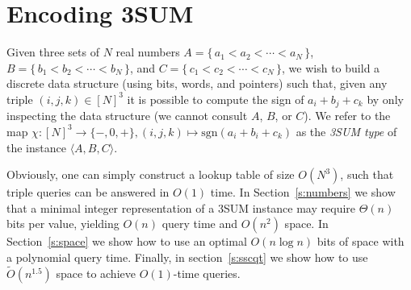 \chapter{Encoding 3SUM}
\label{paper:3sum-encoding}

Given three sets of \(N\) real numbers
\(A = \{\, a_1 < a_2 < \cdots < a_N\,\} \),
\(B = \{\, b_1 < b_2 < \cdots < b_N\,\} \),
and \(C = \{\, c_1 < c_2 < \cdots < c_N\,\}\),
we wish to build a discrete data structure (using bits, words, and pointers) such that,
given any triple \((i,j,k) \in {[N]}^3\) it is possible to compute the sign of
\(a_i + b_j + c_k\) by only inspecting the data structure (we cannot consult
\(A\), \(B\), or \(C\)).
We refer to the map $\chi : {[N]}^3\to \{-,0,+\}, (i,j,k)\mapsto\mathrm{sgn}
(a_i+b_i+c_k)$ as the {\em 3SUM type} of the instance $\langle A,B,C \rangle$.

Obviously, one can simply construct a lookup table of size \(O(N^3)\), such
that triple queries can be answered in \(O(1)\) time.
%
In Section~\ref{s:numbers} we show that a minimal integer representation of a
3SUM instance may require $\Theta(n)$ bits per value, yielding
$O(n)$ query time and $O(n^2)$ space.
%
In Section~\ref{s:space} we show how to use an optimal $O(n \log n)$ bits of
space with a polynomial query time. Finally, in section~\ref{s:sscqt} we show
how to use $\tilde{O}(n^{1.5})$ space to achieve $O(1)$-time queries.


